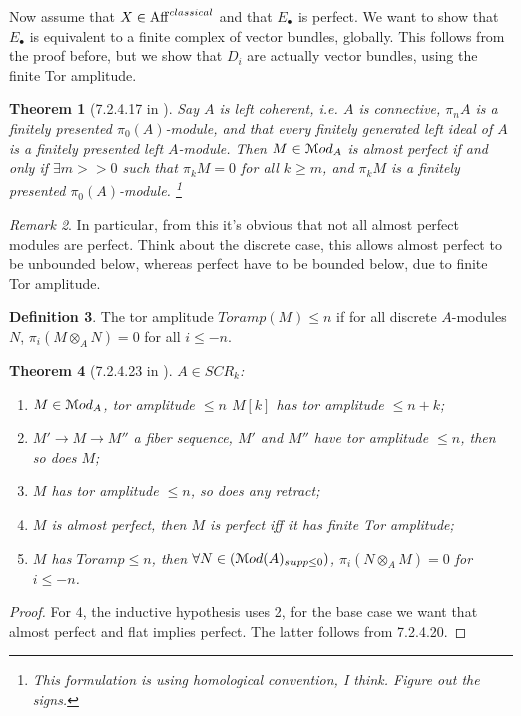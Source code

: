 \documentclass[10pt,a4paper,reqno,oneside]{book} %
\theoremstyle{plain}
\newtheorem{thm}{Theorem}[section]
\theoremstyle{definition}
\newtheorem{defin}[thm]{Definition}
\theoremstyle{remark}
\newtheorem{rem}[thm]{Remark}
\numberwithin{equation}{section}
\begin{document}
Now assume that $X \in \mathrm{Aff}^{classical}$ and that $E_{\bullet}$ is perfect. We want to show that $E_{\bullet}$
is equivalent to a finite complex of vector bundles, globally. This follows from the proof before, but we show that
$D_i$ are actually vector bundles, using the finite Tor amplitude.

\begin{thm}[7.2.4.17 in \cite{Lurie_Higher_algebra}]
Say $A$ is left coherent, i.e. $A$ is connective, $\pi_nA$ is a finitely presented $\pi_0(A)$-module, and that every
finitely generated left ideal of $A$ is a finitely presented left $A$-module. Then $M \in \mathcal M od_A$ is almost perfect
if and only if $\exists m >>0$ such that $\pi_k M = 0$ for all $k\geq m$, and $\pi_k M$ is a finitely presented
$\pi_0(A)$-module. \footnote{This formulation is using homological convention, I think. Figure out the signs.}
\end{thm}

\begin{rem}
In particular, from this it's obvious that not all almost perfect modules are perfect. Think about the discrete case,
this allows almost perfect to be unbounded below, whereas perfect have to be bounded below, due to finite Tor amplitude.
\end{rem}

\begin{defin}
The tor amplitude $Toramp(M) \leq n$ if for all discrete $A$-modules $N$, $\pi_i(M \otimes_A N) = 0$ for all $i\leq -n$.
\end{defin}

\begin{thm}[7.2.4.23 in \cite{Lurie_Higher_algebra}]
$A \in SCR_k$:
\begin{enumerate}
\item $M \in \mathcal M od_A$, tor amplitude $\leq n$ $M[k]$ has tor amplitude $\leq n+k$;
\item $M' \to M \to M''$ a fiber sequence, $M'$ and $M''$ have tor amplitude $\leq n$, then so does $M$;
\item $M$ has tor amplitude $\leq n$, so does any retract;
\item $M$ is almost perfect, then $M$ is perfect iff it has finite Tor amplitude;
\item $M$ has $Toramp \leq n$, then $\forall N \in (\mathcal M od(A)_{supp \leq 0})$, $\pi_i(N\otimes_A M) = 0$ for
	$i \leq -n$.
\end{enumerate}
\end{thm}

\begin{proof}
For 4, the inductive hypothesis uses 2, for the base case we want that almost perfect and flat implies perfect. The latter
follows from 7.2.4.20.
\end{proof}




\end{document}

